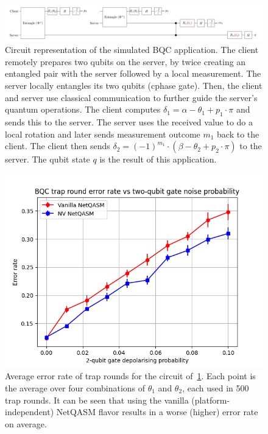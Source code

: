 \begin{figure}[t]
  \centering
  \includegraphics[width=0.6\linewidth]{figures/netqasm/bqc_app.png}
  \caption{Circuit representation of the simulated BQC application. The client
    remotely prepares two qubits on the server, by twice creating an
    entangled pair with the server followed by a local measurement. The
    server locally entangles its two qubits (cphase gate). Then, the client
    and server use classical communication to further guide the server's
    quantum operations. The client computes $\delta_1 = \alpha - \theta_1 +
      p_1 \cdot \pi$ and sends this to the server. The server uses the
    received value to do a local rotation and later sends measurement
    outcome $m_1$ back to the client. The client then sends $\delta_2 =
      (-1)^{m_1} \cdot (\beta - \theta_2 + p_2 \cdot \pi)$ to the server.
    The qubit state $q$ is the result of this application.
  }
  \label{fig:bqc_app}
\end{figure}


\begin{figure}[t]
  \centering
  \includegraphics[scale=0.8]{figures/netqasm/plots/bqc_sweep_gate_noise_trap.png}
  \caption{
    Average error rate of trap rounds for the circuit of~\cref{fig:bqc_app}.
    Each point is the average over four combinations of $\theta_1$ and $\theta_2$,
    each used in 500 trap rounds. It can be seen that using the vanilla (platform-independent)
    \ac{NetQASM} flavor results in a worse (higher) error rate on average.}
  \label{fig:plot_bqc}
\end{figure}

